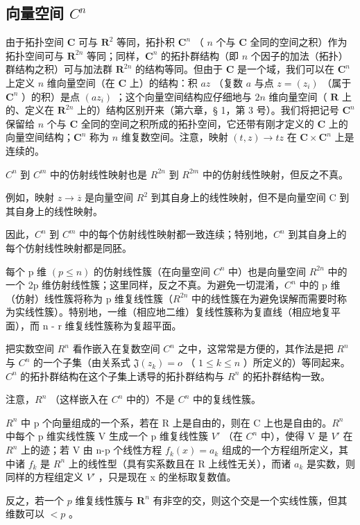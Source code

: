 \subsection{\texorpdfstring{向量空间 \(C^{n}\)}{向量空间 C 的 n 次幂}}

由于拓扑空间 \(\mathbf{C}\) 可与 \(\mathbf{R}^2\) 等同，拓扑积 \(\mathbf{C}^n\) （ \(n\) 个与 \(\mathbf{C}\) 全同的空间之积）作为拓扑空间可与 \(\mathbf{R}^{2n}\) 等同；同样，\(\mathbf{C}^n\) 的拓扑群结构（即 \(n\) 个因子的加法（拓扑）群结构之积）可与加法群 \(\mathbf{R}^{2n}\) 的结构等同。但由于 \(\mathbf{C}\) 是一个域，我们可以在 \(\mathbf{C}^n\) 上定义 \(n\) 维向量空间（在 \(\mathbf{C}\) 上）的结构：积 \(az\) （复数 \(a\) 与点 \(z = (z_i)\) （属于 \(\mathbf{C}^n\) ）的积）是点 \((az_i)\) ；这个向量空间结构应仔细地与 \(2n\) 维向量空间（ \(\mathbf{R}\) 上的、定义在 \(\mathbf{R}^{2n}\) 上的）结构区别开来（第六章，§ 1，第 3 号）。我们将把记号 \(\mathbf{C}^n\) 保留给 \(n\) 个与 \(\mathbf{C}\) 全同的空间之积所成的拓扑空间，它还带有刚才定义的 \(\mathbf{C}\) 上的向量空间结构；\(\mathbf{C}^n\) 称为 \(n\) 维复数空间。注意，映射 \((t, z) \to tz\) 在 \(\mathbf{C} \times \mathbf{C}^n\) 上是连续的。

\(C^{n}\) 到 \(C^{m}\) 中的仿射线性映射也是 \(R^{2n}\) 到 \(R^{2m}\) 中的仿射线性映射，但反之不真。

例如，映射 \(z \rightarrow \overline{z}\) 是向量空间 \(R^{2}\) 到其自身上的线性映射，但不是向量空间 C 到其自身上的线性映射。

因此，\(C^{n}\) 到 \(C^{m}\) 中的每个仿射线性映射都一致连续；特别地，\(C^{n}\) 到其自身上的每个仿射线性映射都是同胚。

每个 p 维 \((p \leqslant n)\) 的仿射线性簇（在向量空间 \(C^{n}\) 中）也是向量空间 \(R^{2n}\) 中的一个 2p 维仿射线性簇；这里同样，反之不真。为避免一切混淆，\(C^{n}\) 中的 p 维（仿射）线性簇将称为 p 维复线性簇（\(R^{2n}\) 中的线性簇在为避免误解而需要时称为实线性簇）。特别地，一维（相应地二维）复线性簇称为复直线（相应地复平面），而 n - r 维复线性簇称为复超平面。

把实数空间 \(R^{n}\) 看作嵌入在复数空间 \(C^{n}\) 之中，这常常是方便的，其作法是把 \(R^{n}\) 与 \(C^{n}\) 的一个子集（由关系式 \(\mathfrak{J}(z_{k}) = o\) （ \(1 \leqslant k \leqslant n\) ）所定义的）等同起来。\(C^{n}\) 的拓扑群结构在这个子集上诱导的拓扑群结构与 \(R^{n}\) 的拓扑群结构一致。

注意，\(R^{n}\) （这样嵌入在 \(C^{n}\) 中的）不是 \(C^{n}\) 中的复线性簇。

\(R^{n}\) 中 p 个向量组成的一个系，若在 R 上是自由的，则在 C 上也是自由的。\(R^{n}\) 中每个 p 维实线性簇 V 生成一个 p 维复线性簇 \(V'\) （在 \(C^{n}\) 中），使得 V 是 \(V'\) 在 \(R^{n}\) 上的迹；若 V 由 n-p 个线性方程 \(f_{k}(x)=a_{k}\) 组成的一个方程组所定义，其中诸 \(f_{k}\) 是 \(R^{n}\) 上的线性型（具有实系数且在 R 上线性无关），而诸 \(a_{k}\) 是实数，则同样的方程组定义 \(V'\) ，只是现在 x 的坐标取复数值。

反之，若一个 \(p\) 维复线性簇与 \(\mathbf{R}^n\) 有非空的交，则这个交是一个实线性簇，但其维数可以 \(< p\) 。

